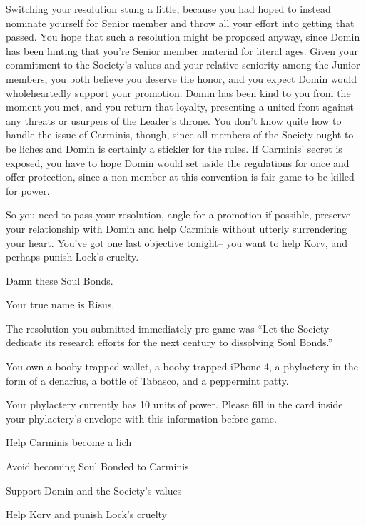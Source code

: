 \documentclass[char]{Sel}
\begin{document}
Switching your resolution stung a little, because you had hoped to instead nominate yourself for Senior member and throw all your effort into getting that passed. You hope that such a resolution might be proposed anyway, since Domin has been hinting that you're Senior member material for literal ages. Given your commitment to the Society's values and your relative seniority among the Junior members, you both believe you deserve the honor, and you expect Domin would wholeheartedly support your promotion.
Domin has been kind to you from the moment you met, and you return that loyalty, presenting a united front against any threats or usurpers of the Leader’s throne. You don't know quite how to handle the issue of Carminis, though, since all members of the Society ought to be liches and Domin is certainly a stickler for the rules. If Carminis' secret is exposed, you have to hope Domin would set aside the regulations for once and offer protection, since a non-member at this convention is fair game to be killed for power.

So you need to pass your resolution, angle for a promotion if possible, preserve your relationship with Domin and help Carminis without utterly surrendering your heart. You’ve got one last objective tonight-- you want to help Korv, and perhaps punish Lock's cruelty.

Damn these Soul Bonds.


\begin{itemz}[Notes]
  \item Your true name is Risus.
  \item The resolution you submitted immediately pre-game was ``Let the Society dedicate its research efforts for the next century to dissolving Soul Bonds.''
   \item You own a booby-trapped wallet, a booby-trapped iPhone 4, a phylactery in the form of a denarius, a bottle of Tabasco, and a peppermint patty.
   \item Your phylactery currently has 10 units of power. Please fill in the card inside your phylactery's envelope with this information before game.
    \end{itemz}
    
  
 \begin{itemz}[Goals]
\item Help Carminis become a lich
\item Avoid becoming Soul Bonded to Carminis
\item Support Domin and the Society's values
\item Help Korv and punish Lock's cruelty
\end{itemz}
\end{document}
